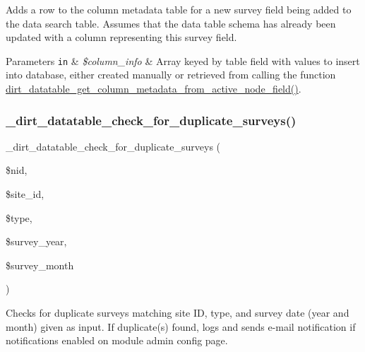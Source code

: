 Adds a row to the column metadata table for a new survey field being added to the data search table. Assumes that the data table schema has already been updated with a column representing this survey field.


\begin{DoxyParams}[1]{Parameters}
\mbox{\tt in}  & {\em \$column\+\_\+info} & Array keyed by table field with values to insert into database, either created manually or retrieved from calling the function \mbox{\hyperlink{dirt__datatable_8module_a76e7c95dbdc9c29ce2108bb34ae64604}{dirt\+\_\+datatable\+\_\+get\+\_\+column\+\_\+metadata\+\_\+from\+\_\+active\+\_\+node\+\_\+field()}}. \\
\hline
\end{DoxyParams}
\mbox{\label{dirt__datatable_8search__table__db__ops_8inc_af3f729b4b71a844cb3351d452678117a}} 
\subsubsection{\texorpdfstring{\+\_\+dirt\+\_\+datatable\+\_\+check\+\_\+for\+\_\+duplicate\+\_\+surveys()}{\_dirt\_datatable\_check\_for\_duplicate\_surveys()}}
{\footnotesize\ttfamily \+\_\+dirt\+\_\+datatable\+\_\+check\+\_\+for\+\_\+duplicate\+\_\+surveys (\begin{DoxyParamCaption}\item[{}]{\$nid,  }\item[{}]{\$site\+\_\+id,  }\item[{}]{\$type,  }\item[{}]{\$survey\+\_\+year,  }\item[{}]{\$survey\+\_\+month }\end{DoxyParamCaption})}

Checks for duplicate surveys matching site ID, type, and survey date (year and month) given as input. If duplicate(s) found, logs and sends e-\/mail notification if notifications enabled on module admin config page.


